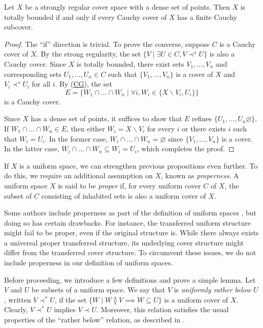 \documentclass[reqno]{amsart}
\newcommand{\axref}[1]{(\hyperref[ax:#1]{#1})}
\theoremstyle{definition}
\theoremstyle{remark}
\numberwithin{figure}{section}
\newcommand{\overlap}[2]{#1 \between #2}
\newcommand{\rb}{\prec}
\begin{document}
\begin{prop}
Let $X$ be a strongly regular cover space with a dense set of points.
Then $X$ is totally bounded if and only if every Cauchy cover of $X$ has a finite Cauchy subcover.
\end{prop}
\begin{proof}
The ``if'' direction is trivial.
To prove the converse, suppose $C$ is a Cauchy cover of $X$.
By the strong regularity, the set $\{ V \mid \exists U \in C, V \rb^s U \}$ is also a Cauchy cover.
Since $X$ is totally bounded, there exist sets $V_1, \ldots, V_n$ and corresponding sets $U_1, \ldots, U_n \in C$ such that $\{ V_1, \ldots, V_n \}$ is a cover of $X$ and $V_i \rb^s U_i$ for all $i$.
By \axref{CG}, the set
\[ E = \{ W_1 \cap \ldots \cap W_n \mid \forall i, W_i \in \{ X \backslash V_i, U_i \} \} \]
is a Cauchy cover.

Since $X$ has a dense set of points, it suffices to show that $E$ refines $\{ U_1, \ldots, U_n \varnothing \}$.
If $W_1 \cap \ldots \cap W_n \in E$, then either $W_i = X \backslash V_i$ for every $i$ or there exists $i$ such that $W_i = U_i$.
In the former case, $W_i \cap \ldots \cap W_n = \varnothing$ since $\{ V_1, \ldots, V_n \}$ is a cover.
In the latter case, $W_i \cap \ldots \cap W_n \subseteq W_i = U_i$, which completes the proof.
\end{proof}

If $X$ is a uniform space, we can strengthen previous propositions even further.
To do this, we require an additional assumption on $X$, known as \emph{properness}.
A uniform space $X$ is said to be \emph{proper} if, for every uniform cover $C$ of $X$, the subset of $C$ consisting of inhabited sets is also a uniform cover of $X$. 

Some authors include properness as part of the definition of uniform spaces \cite{uniform-locales}, but doing so has certain drawbacks.
For instance, the transferred uniform structure might fail to be proper, even if the original structure is.
While there always exists a universal proper transferred structure, its underlying cover structure might differ from the transferred cover structure.
To circumvent these issues, we do not include properness in our definition of uniform spaces.

Before proceeding, we introduce a few definitions and prove a simple lemma.
Let $V$ and $U$ be subsets of a uniform space.
We say that $V$ is \emph{uniformly rather below} $U$, written $V \rb^* U$, if the set $\{ W \mid \overlap{W}{V} \implies W \subseteq U \}$ is a uniform cover of $X$.
Clearly, $V \rb^* U$ implies $V \rb U$.
Moreover, this relation satisfies the usual properties of the ``rather below'' relation, as described in .
\end{document}
